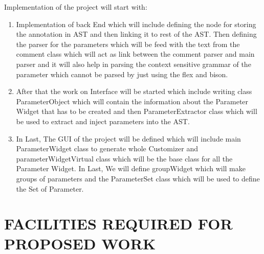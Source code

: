\documentclass[12pt,includeheadfoot,a4paper]{report}
\begin{document}
Implementation of the project will start with:
\begin{enumerate}
	\item Implementation of back End which will include defining the node for storing the annotation in AST and then linking it to rest of the AST. Then defining the parser for the parameters which will be feed with the text from the comment class which will act as link between the comment parser and main parser and it will also help in parsing the context sensitive grammar of the parameter which cannot be parsed by just using the flex and bison.
	\item After that the work on Interface will be started which include writing class ParameterObject which will contain the information about the Parameter Widget that has to be created and then ParameterExtractor class which will be used to extract and inject parameters into the AST.
	\item In Last, The GUI of the project will be defined which will include main ParameterWidget class to generate whole Customizer and parameterWidgetVirtual class which will be the base class for all the Parameter Widget. In Last, We will define groupWidget which will make groups of parameters and the ParameterSet class which will be used to define the Set of Parameter.
\end{enumerate}
 
\chapter{FACILITIES REQUIRED FOR PROPOSED WORK}
\end{document}
